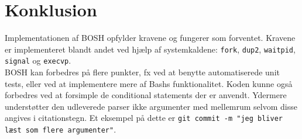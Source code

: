 \section{Konklusion}
Implementationen af BOSH opfylder kravene og fungerer som forventet. Kravene er implementeret blandt andet ved hjælp af systemkaldene: \texttt{fork}, \texttt{dup2}, \texttt{waitpid}, \texttt{signal} og \texttt{execvp}.\\

BOSH kan forbedres på flere punkter, fx ved at benytte automatiserede unit tests, eller ved at implementere mere af Bashs funktionalitet. Koden kunne også forbedres ved at forsimple de conditional statements der er anvendt. Ydermere understøtter den udleverede parser ikke argumenter med mellemrum selvom disse angives i citationstegn. Et eksempel på dette er \texttt{git commit -m "jeg bliver læst som flere argumenter"}.